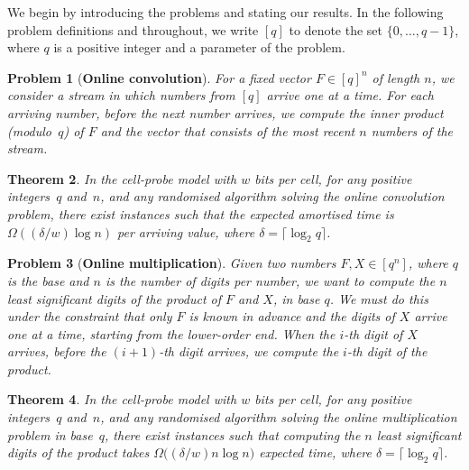 \documentclass[11pt]{article}
\numberwithin{equation}{section}
\newtheorem{theorem}{Theorem}[section]
\theoremstyle{definition}
\theoremstyle{plain}
\newtheorem{problem}[theorem]{Problem}
\begin{document}
We begin by introducing the problems and stating our results. In the following problem definitions and throughout, we write $[q]$ to denote the set $\{0,\dots,q-1\}$, where $q$ is a positive integer and a parameter of the problem.

\begin{problem}[\textbf{Online convolution}]
  For a fixed vector $F\in[q]^n$ of length $n$, we consider a stream in which numbers from $[q]$ arrive one at a time. For each arriving number, before the next number arrives, we
%
compute  %
the inner product (modulo~$q$) of $F$ and the vector that consists of the most recent  $n$ numbers of the stream.
\end{problem}

%


\begin{theorem}
	\label{thm:conv}
	In the cell-probe model with $w$ bits per cell, for any positive integers~$q$ and~$n$, and any randomised algorithm solving the online convolution problem, there exist instances such that the expected amortised time is  $\Omega{(({\delta}/{w})\log n)}$ per arriving value, where $\delta=\lceil \log_{2}{q} \rceil$.
\end{theorem}


%

%
%
%
%

\begin{problem}[\textbf{Online multiplication}]
Given two numbers $F,X\in [q^n]$, where $q$ is the base and $n$ is the number of digits per number, we want to
%
compute   %
the $n$ least significant digits of the product of $F$ and $X$, in base $q$.
	We must do this under the constraint that only $F$ is known in advance and the digits of $X$ arrive one at a time, starting from the lower-order end.
	When the $i$-th digit of $X$
%
arrives,   %
before the $(i+1)$-th digit
%
arrives,   %
we
%
compute   %
the $i$-th digit of the product.
\end{problem}

\begin{theorem}
	\label{thm:mult}
	In the cell-probe model with $w$ bits per cell, for any positive integers~$q$ and~$n$, and any randomised algorithm solving the online multiplication problem in base~$q$, there exist instances such that
%
computing    %
the $n$ least significant digits of the product takes $\Omega{(({\delta}/{w})n\log n})$ expected time, where $\delta=\lceil \log_2q \rceil$.
\end{theorem}

%
\end{document}

